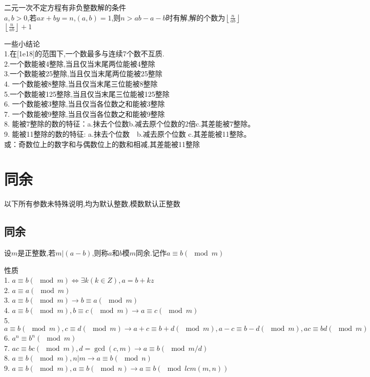 \begin{corollary}
  二元一次不定方程有非负整数解的条件\\
  $a,b>0$,若$ax+by=n$,$(a,b)=1$,则$n>ab-a-b$时有解,解的个数为$\left\lfloor \frac{n}{ab} \right\rfloor$
  $\left\lfloor \frac{n}{ab} \right\rfloor+1$ 
\end{corollary}

一些小结论\\
  1.在[1e18]的范围下,一个数最多与连续7个数不互质.\\
  2.一个数能被4整除,当且仅当末尾两位能被4整除\\
  3.一个数能被25整除,当且仅当末尾两位能被25整除\\
  4. 一个数能被8整除,当且仅当末尾三位能被8整除\\
  5.一个数能被125整除,当且仅当末尾三位能被125整除\\
  6. 一个数能被3整除,当且仅当各位数之和能被3整除\\
  7. 一个数能被9整除,当且仅当各位数之和能被9整除\\
  8. 能被7整除的数的特征：a.抹去个位数b.减去原个位数的2倍c.其差能被7整除。\\
  9. 能被11整除的数的特征: a.抹去个位数　b.减去原个位数 c.其差能被11整除。或：奇数位上的数字和与偶数位上的数和相减,其差能被11整除
\section{同余}
以下所有参数未特殊说明,均为默认整数,模数默认正整数\\

\subsection{同余}

\begin{definition}
  设$m$是正整数,若$m|(a-b)$,则称$a$和$b$模$m$同余.记作$a \equiv b(\mod m)$
\end{definition}

性质\\
1. $a \equiv b (\mod m) \iff \exists k (k\in Z),a=b+kz$\\
2. $a \equiv a(\mod m)$\\
3. $a \equiv b(\mod m) \rightarrow b \equiv a(\mod m)$\\
4. $a \equiv b(\mod m),b \equiv c(\mod m) \rightarrow a \equiv c(\mod m)$\\
5. $a \equiv b(\mod m),c \equiv d(\mod m)\rightarrow a+c \equiv b+d(\mod m) ,a-c \equiv b-d(\mod m),ac \equiv bd(\mod m)$\\
6. $a^n \equiv b^n(\mod m)$\\
7. $ac \equiv bc (\mod m),d=\gcd(c,m)\rightarrow a \equiv b (\mod m/d)$\\
8. $a \equiv b (\mod m),n|m \rightarrow a \equiv b (\mod n)$\\
9. $a \equiv b (\mod m),a \equiv b (\mod n)\rightarrow a \equiv b (\mod lcm(m,n))$\\


